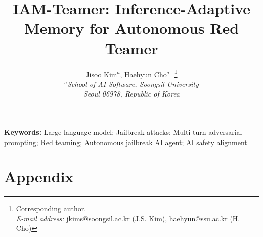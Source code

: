 \documentclass[11pt]{article}
\title{IAM-Teamer: Inference-Adaptive Memory for Autonomous Red Teamer}
\author{
  \large Jisoo Kim$^{a}$,
  \large Haehyun Cho$^{a,}$
  \thanks{Corresponding author. \\ \hspace*{1.8em}\textit{E-mail address:} jkims@soongsil.ac.kr (J.S. Kim), haehyun@ssu.ac.kr (H. Cho)} \\[4pt]
  \small\itshape $^{a}$School of AI Software, Soongsil University \\[3pt]
  \small\itshape Seoul 06978, Republic of Korea
}
\date{}
\begin{document}
\maketitle



\smallskip
\noindent\textbf{Keywords:} Large language model; Jailbreak attacks; Multi-turn adversarial prompting; Red teaming; Autonomous jailbreak AI agent; AI safety alignment












\appendix
{}
\section*{Appendix}

\end{document}
